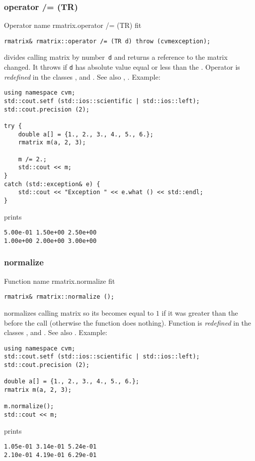 \subsubsection{operator /= (TR)}
Operator%
\pdfdest name {rmatrix.operator /= (TR)} fit
\begin{verbatim}
rmatrix& rmatrix::operator /= (TR d) throw (cvmexception);
\end{verbatim}
divides  calling matrix by  number~\verb"d"
and returns a reference to
the matrix changed.
It throws  
if \verb"d" has  absolute value equal or less
than the
.
Operator is \emph{redefined} in the classes
, 
and .
See also ,
.
Example:
\begin{Verbatim}
using namespace cvm;
std::cout.setf (std::ios::scientific | std::ios::left);
std::cout.precision (2);

try {
    double a[] = {1., 2., 3., 4., 5., 6.};
    rmatrix m(a, 2, 3);

    m /= 2.;
    std::cout << m;
}
catch (std::exception& e) {
    std::cout << "Exception " << e.what () << std::endl;
}
\end{Verbatim}
prints
\begin{Verbatim}
5.00e-01 1.50e+00 2.50e+00
1.00e+00 2.00e+00 3.00e+00
\end{Verbatim}
\newpage



\subsubsection{normalize}
Function%
\pdfdest name {rmatrix.normalize} fit
\begin{verbatim}
rmatrix& rmatrix::normalize ();
\end{verbatim}
normalizes  calling matrix so its 
becomes equal to $1$ if it was greater than the
before the call (otherwise the function does nothing).
Function is \emph{redefined} in the classes
, 
and .
See also .
Example:
\begin{Verbatim}
using namespace cvm;
std::cout.setf (std::ios::scientific | std::ios::left);
std::cout.precision (2);

double a[] = {1., 2., 3., 4., 5., 6.};
rmatrix m(a, 2, 3);

m.normalize();
std::cout << m;
\end{Verbatim}
prints
\begin{Verbatim}
1.05e-01 3.14e-01 5.24e-01
2.10e-01 4.19e-01 6.29e-01
\end{Verbatim}
\newpage






